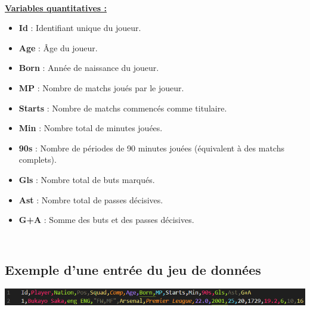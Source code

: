 \documentclass[11pt]{scrartcl}
\begin{document}
        \textbf{\\\underline{Variables quantitatives :}\\}
            \begin{itemize}

                \item \textbf{Id} : Identifiant unique du joueur.
                \item \textbf{Age} : Âge du joueur.
                \item \textbf{Born} : Année de naissance du joueur.
                \item \textbf{MP} : Nombre de matchs joués par le joueur.
                \item \textbf{Starts} : Nombre de matchs commencés comme titulaire.
                \item \textbf{Min} : Nombre total de minutes jouées.
                \item \textbf{90s} : Nombre de périodes de 90 minutes jouées (équivalent à des matchs complets).
                \item \textbf{Gls} : Nombre total de buts marqués.
                \item \textbf{Ast} : Nombre total de passes décisives.
                \item \textbf{G+A} : Somme des buts et des passes décisives.
            
            \end{itemize}

        \subsection{\\Exemple d'une entrée du jeu de données\\}

        \begin{center}

            \includegraphics[width=1\textwidth]{images/exemple_entree.png}

        \end{center}    



\end{document}
